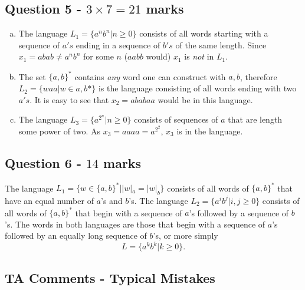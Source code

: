 \documentclass[12pt]{article}
\begin{document}
\subsection*{Question 5 - $3 \times 7 = 21$ marks}
\begin{enumerate}[(a)]
\item The language $L_1 = \{a^n b^n | n \geq 0 \}$ consists of all words starting with a sequence of $a's$ ending in a sequence of $b's$ of the same length. Since $x_1 = abab \neq a^n b^n$ for some $n$ ($aabb$ would) $x_1$ is \emph{not} in $L_1$.

\item The set $\{a,b\}^*$ contains \emph{any} word one can construct with $a,b$, therefore $L_2 = \{waa | w \in {a,b}* \}$ is the language consisting of all words ending with two $a's$. It is easy to see that $x_2 = ababaa$ would be in this language.

\item The language $L_3 = \{a^{2^n} | n \geq 0\}$ consists of sequences of $a$ that are length some power of two. As $x_3 = aaaa = a^{2^2}$, $x_3$ is in the language.
\end{enumerate}

\subsection*{Question 6 - $14$ marks}
The language $L_1 = \{ w \in \{ a,b\}^* | |w|_a = |w|_b \}$ consists of all words of $\{a,b\}^*$ that have an equal number of $a$'s and $b$'s. The language $L_2 = \{a^ib^j | i,j \geq 0 \}$ consists of all words of $\{a,b\}^*$ that begin with a sequence of $a$'s followed by a sequence of $b$'s. The words in both languages are those that begin with a sequence of $a$'s followed by an equally long sequence of $b$'s, or more simply
$$L = \{ a^kb^k | k \geq 0 \} .$$

\clearpage

\subsection*{TA Comments - Typical Mistakes}
\end{document}
